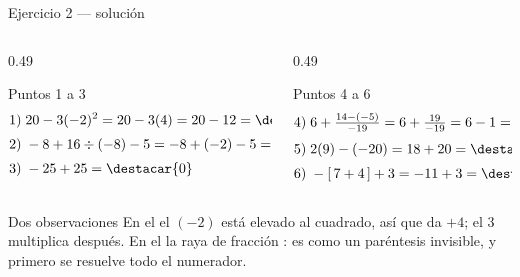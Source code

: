 \documentclass[aspectratio=169,10pt]{beamer}
\begin{document}
\begin{frame}{Ejercicio 2 — solución}
  \tiny
  \begin{columns}[T,onlytextwidth]
    \begin{column}{0.49\textwidth}
      \begin{block}{Puntos 1 a 3}
        \tiny
        \begin{align*}
          1)\;& 20 - 3(-2)^2 = 20 - 3(4) = 20-12 = \destacar{8} \\[0.25em]
          2)\;& -8 + 16\div(-8) - 5 = -8 + (-2) - 5 = \destacar{-15} \\[0.25em]
          3)\;& -25 + 25 = \destacar{0}
        \end{align*}
      \end{block}
    \end{column}
    \begin{column}{0.49\textwidth}
      \begin{block}{Puntos 4 a 6}
        \tiny
        \begin{align*}
          4)\;& 6 + \tfrac{14-(-5)}{-19} = 6 + \tfrac{19}{-19}
                = 6 - 1 = \destacar{5} \\[0.25em]
          5)\;& 2(9) - (-20) = 18 + 20 = \destacar{38} \\[0.25em]
          6)\;& -[\,7+4\,] + 3 = -11 + 3 = \destacar{-8}
        \end{align*}
      \end{block}
    \end{column}
  \end{columns}

  \vspace{0.1cm}
  \begin{alertblock}{Dos observaciones}
    \tiny
    En el  el $(-2)$ está elevado al cuadrado, así que da $+4$; el
    $3$ multiplica después. \quad
    En el  la raya de fracción : es como un paréntesis
    invisible, y primero se resuelve todo el numerador.
  \end{alertblock}
\end{frame}

\end{document}
